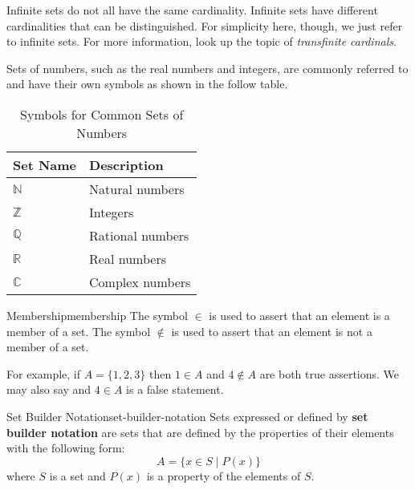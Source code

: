 \begin{advancedTopic}
  Infinite sets do not all have the same cardinality. Infinite sets have different cardinalities
  that can be distinguished. For simplicity here, though, we just refer to infinite sets. For more
  information, look up the topic of \emph{transfinite cardinals}.
\end{advancedTopic}


Sets of numbers, such as the real numbers and integers, are commonly referred to and have
their own symbols as shown in the follow table.
\begin{table}[H]
  \centering
  \begin{tabular}{p{1in} p{2in}}
  \toprule
  \textbf{Set Name} & \textbf{Description} \\
  \midrule
  \(\mathbb{N}\) & Natural numbers \\
  \(\mathbb{Z}\) & Integers \\
  \(\mathbb{Q}\) & Rational numbers \\
  \(\mathbb{R}\) & Real numbers \\
  \(\mathbb{C}\) & Complex numbers \\
  \bottomrule
  \end{tabular}
  \caption{Symbols for Common Sets of Numbers}
\end{table}

\begin{definition}{Membership}{membership}
  The symbol \( \in \) is used to assert that an element is a member of a set.
  The symbol \( \notin \) is used to assert that an element is not a member of a set.
\end{definition}

For example, if \( A = \{ 1, 2, 3 \} \) then \( 1 \in A \) and \( 4 \notin A \) are both
true assertions. We may also say and \( 4 \in A \) is a false statement.

\begin{definition}{Set Builder Notation}{set-builder-notation}
  Sets expressed or defined by \textbf{set builder notation} are sets that are defined by
  the properties of their elements with the following form:
  \[
    A = \{ x \in S \mid P(x) \}
  \]
  where \( S \) is a set and \( P(x) \) is a property of the elements of \( S \).
\end{definition}

